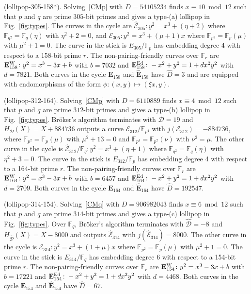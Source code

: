 \documentclass[version=preprint]{iacrcc}
\newcommand{\F}{\mathbb{F}}
\newcommand{\EC}{\mathcal{E}}
\newcommand{\D}{\mathcal{D}}
\begin{document}
\begin{example}(\textsf{lollipop-305-158}*).\label{example:305-158} 
Solving~\eqref{CMp} with $D=54105234$ finds $x \equiv 10 \bmod{12}$ such that $p$ and $q$ are prime $305$-bit primes and gives a type-(a) lollipop in Fig.~\ref{fig:types}. The curves in the cycle are $\hat{\EC}_{305} \colon y^2=x^3+(\eta+2)$ where  $\F_{q^2}=\F_q(\eta)$ with $\eta^2+2=0$, and ${\EC}_{305} \colon y^2=x^3+(\mu+1)x$ where $\F_{p^2}=\F_p(\mu)$ with $\mu^2+1=0$. The curve in the stick is $E_{305}/\F_p$ has embedding degree 4 with respect to a 158-bit prime $r$. The non-pairing-friendly curves over $\F_r$ are $\mathbf{E}_{158}^{\rm W} \colon y^2=x^3-3x+b$ with $b=7032$ and $\mathbf{E}_{158}^{\rm Ed} \colon -x^2+y^2=1+dx^2y^2$ with $d=7821$. Both curves in the cycle $\mathbf{E}_{158}$ and $\hat{\mathbf{E}}_{158}$ have $\hat{D}=3$ and are equipped with endomorphisms of the form $\phi \colon (x,y) \mapsto (\xi x,y)$. 
\end{example}

\begin{example}(\textsf{lollipop-312-164}).\label{example:312-164} 
Solving~\eqref{CMp} with $D=6110889$ finds $x \equiv 4 \bmod{12}$ such that $p$ and $q$ are prime $312$-bit primes and gives a type-(b) lollipop in Fig.~\ref{fig:types}. Br{\"o}ker's algorithm terminates with $\D=19$ and $H_\D(X)= X + 884736$ outputs a curve ${\EC}_{312}/\F_{p^4}$ with $j({\EC}_{312})=-884736$, where $\F_{p^2}=\F_p(\mu)$ with $\mu^2+13=0$ and $\F_{p^4}=\F_{p^2}(\nu)$ with $\nu^2=\mu$. The other curve in the cycle is $\hat{\EC}_{312}/\F_q \colon y^2=x^3+(\eta+1)$ where  $\F_{q^2}=\F_q(\eta)$ with $\eta^2+3=0$. The curve in the stick is $E_{312}/\F_p$ has embedding degree 4 with respect to a 164-bit prime $r$. The non-pairing-friendly curves over $\F_r$ are $\mathbf{E}_{164}^{\rm W} \colon y^2=x^3-3x+b$ with $b=6457$ and $\mathbf{E}_{164}^{\rm Ed} \colon -x^2+y^2=1+dx^2y^2$ with $d=2709$. Both curves in the cycle $\mathbf{E}_{164}$ and $\hat{\mathbf{E}}_{164}$ have $\hat{D}=192547$. 
\end{example}

\begin{example}(\textsf{lollipop-314-154}).\label{example:314-154}  
Solving~\eqref{CMq} with $D=906982043$ finds $x \equiv 6 \bmod{12}$ such that $p$ and $q$ are prime $314$-bit primes and gives a type-(c) lollipop in Fig.~\ref{fig:types}. Over $\F_q$, Br{\"o}ker's algorithm terminates with $\hat{\D}=-8$ and $H_{\hat{\D}}(X)= X -8000$ and outputs $\hat{\EC}_{314}$ with $j(\hat{\EC}_{314}) =8000$. The other curve in the cycle is ${\EC}_{314} \colon y^2=x^3+(1+\mu)x$  where $\F_{p^2}=\F_p(\mu)$ with $\mu^2+1=0$.  The curve in the stick is $E_{314}/\F_q$ has embedding degree 6 with respect to a 154-bit prime $r$. The non-pairing-friendly curves over $\F_r$ are $\mathbf{E}_{154}^{\rm W} \colon y^2=x^3-3x+b$ with $b=17221$ and $\mathbf{E}_{154}^{\rm Ed} \colon -x^2+y^2=1+dx^2y^2$ with $d=4468$. Both curves in the cycle $\mathbf{E}_{154}$ and $\hat{\mathbf{E}}_{154}$ have $\hat{D}=67$. 
\end{example}
\end{document}
